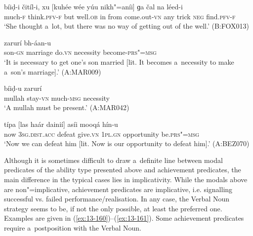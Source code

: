 \begin{exe}
\ex
\label{ex:13-156}
\gll bíiḍ-i čitíl-i, xu [kuhée wée yúu   nikh"=aníi] ɡa čal na léed-i  \\
much-\textsc{f} think.\textsc{pfv-f} but well.\textsc{ob} in from  come.out-\textsc{vn} any trick \textsc{neg} find.\textsc{pfv-f}  \\
\glt `She thought a~lot, but there was no way of getting out of the well.' (B:FOX013)

\ex
\label{ex:13-157}
 zarurí bh-áan-u \\
son-\textsc{gn} marriage do.\textsc{vn} necessity become-\textsc{prs"=msg}  \\
\glt `It is necessary to get one's son married [lit. It becomes a~necessity to make a~son's marriage].' (A:MAR009)

\ex
\label{ex:13-158}
\gll [muloó haans"=ainií] bíiḍ-u zarurí \\
mullah stay-\textsc{vn}  much-\textsc{msg} necessity  \\
\glt `A mullah must be present.' (A:MAR042)

\ex
\label{ex:13-159}
\gll típa [las haár dainií] asíi mooqá  hín-u \\
now \textsc{3sg.dist.acc} defeat give.\textsc{vn} \textsc{1pl.gn} opportunity be.\textsc{prs"=msg}  \\
\glt `Now we can defeat him [lit. Now is our opportunity to defeat him].' (A:BEZ070) 
\end{exe}

 Although it is sometimes difficult to draw a~definite line between modal predicates of the ability type presented above and achievement predicates, the main difference in the typical cases lies in implicativity. While the modals above are non"=implicative, achievement predicates are implicative, i.e. signalling successful vs. failed performance/realisation. In any case, the Verbal Noun strategy seems to be, if not the only possible, at least the preferred one. Examples are given in (\ref{ex:13-160})--(\ref{ex:13-161}). Some achievement predicates require a~postposition with the Verbal Noun.

